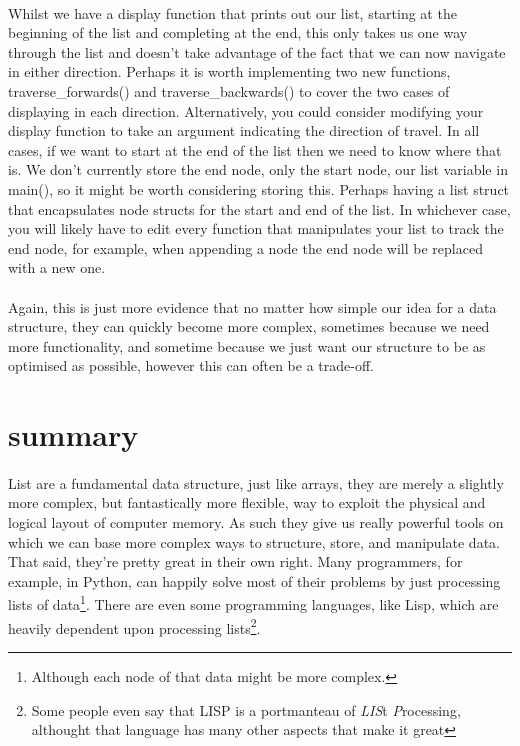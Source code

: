 \documentclass[10pt, a4paper, twosize]{article}
\begin{document}
\paragraph{} Whilst we have a display function that prints out our list, starting at the beginning of the list and completing at the end, this only takes us one way through the list and doesn't take advantage of the fact that we can now navigate in either direction. Perhaps it is worth implementing two new functions, traverse\_forwards() and traverse\_backwards() to cover the two cases of displaying in each direction. Alternatively, you could consider modifying your display function to take an argument indicating the direction of travel. In all cases, if we want to start at the end of the list then we need to know where that is. We don't currently store the end node, only the start node, our list variable in main(), so it might be worth considering storing this. Perhaps having a list struct that encapsulates node structs for the start and end of the list. In whichever case, you will likely have to edit every function that manipulates your list to track the end node, for example, when appending a node the end node will be replaced with a new one.

\paragraph{} Again, this is just more evidence that no matter how simple our idea for a data structure, they can quickly become more complex, sometimes because we need more functionality, and sometime because we just want our structure to be as optimised as possible, however this can often be a trade-off.

\section{summary}
\paragraph{} List are a fundamental data structure, just like arrays, they are merely a slightly more complex, but fantastically more flexible, way to exploit the physical and logical layout of computer memory. As such they give us really powerful tools on which we can base more complex ways to structure, store, and manipulate data. That said, they're pretty great in their own right. Many programmers, for example, in Python, can happily solve most of their problems by just processing lists of data\footnote{Although each node of that data might be more complex.}. There are even some programming languages, like Lisp, which are heavily dependent upon processing lists\footnote{Some people even say that LISP is a portmanteau of \emph{LIS}t \emph{P}rocessing, althought that language has many other aspects that make it great}.
\end{document}
